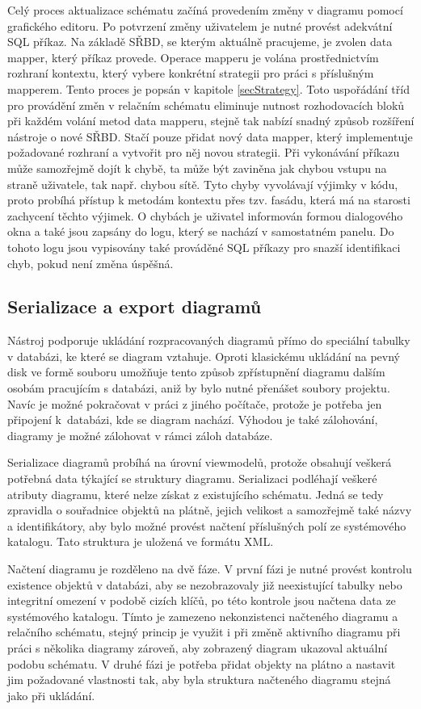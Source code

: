 \documentclass[czech,bachelor,public,dept460,male,oneside]{diploma}
\begin{document}
	Celý proces aktualizace schématu začíná provedením změny v diagramu pomocí grafického editoru. Po potvrzení změny uživatelem je nutné provést adekvátní SQL příkaz. Na základě SŘBD, se kterým aktuálně pracujeme, je zvolen data mapper, který příkaz provede. Operace mapperu je volána prostřednictvím rozhraní kontextu, který vybere konkrétní strategii pro práci s příslušným mapperem. Tento proces je popsán v kapitole \ref{secStrategy}. Toto uspořádání tříd pro provádění změn v relačním schématu eliminuje nutnost rozhodovacích bloků při každém volání metod data mapperu, stejně tak nabízí snadný způsob rozšíření nástroje o nové SŘBD. Stačí pouze přidat nový data mapper, který implementuje požadované rozhraní a vytvořit pro něj novou strategii. Při vykonávání příkazu může samozřejmě dojít k chybě, ta může být zaviněna jak chybou vstupu na straně uživatele, tak např. chybou sítě. Tyto chyby vyvolávají výjimky v kódu, proto probíhá přístup k metodám kontextu přes tzv. fasádu, která má na starosti zachycení těchto výjimek. O chybách je uživatel informován formou dialogového okna a také jsou zapsány do logu, který se nachází v samostatném panelu. Do tohoto logu jsou vypisovány také prováděné SQL příkazy pro snazší identifikaci chyb, pokud není změna úspěšná.
	
	\subsection{Serializace a export diagramů}
	Nástroj podporuje ukládání rozpracovaných diagramů přímo do speciální tabulky v databázi, ke které se diagram vztahuje. Oproti klasickému ukládání na pevný disk ve formě souboru umožňuje tento způsob zpřístupnění diagramu dalším osobám pracujícím s databázi, aniž by bylo nutné přenášet soubory projektu. Navíc je možné pokračovat v práci z jiného počítače, protože je potřeba jen připojení k~databázi, kde se diagram nachází. Výhodou je také zálohování, diagramy je možné zálohovat v rámci záloh databáze.
	
	Serializace diagramů probíhá na úrovní viewmodelů, protože obsahují veškerá potřebná data týkající se struktury diagramu. Serializaci podléhají veškeré atributy diagramu, které nelze získat z existujícího schématu. Jedná se tedy zpravidla o souřadnice objektů na plátně, jejich velikost a samozřejmě také názvy a identifikátory, aby bylo možné provést načtení příslušných polí ze systémového katalogu. Tato struktura je uložená ve formátu XML.
	
	Načtení diagramu je rozděleno na dvě fáze. V první fázi je nutné provést kontrolu existence objektů v databázi, aby se nezobrazovaly již neexistující tabulky nebo integritní omezení v podobě cizích klíčů, po této kontrole jsou načtena data ze systémového katalogu. Tímto je zamezeno nekonzistenci načteného diagramu a relačního schématu, stejný princip je využit i při změně aktivního diagramu při práci s několika diagramy zároveň, aby zobrazený diagram ukazoval aktuální podobu schématu. V druhé fázi je potřeba přidat objekty na plátno a nastavit jim požadované vlastnosti tak, aby byla struktura načteného diagramu stejná jako při ukládání.
	
\end{document}
